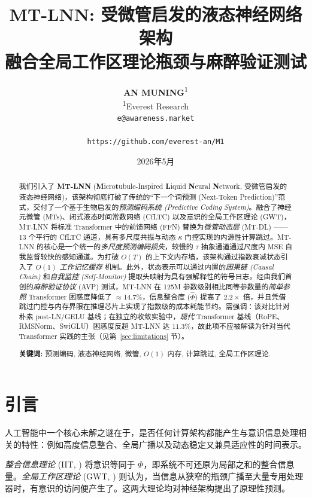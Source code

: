\documentclass[11pt]{article}
\title{
  \textbf{MT-LNN: 受微管启发的液态神经网络架构\\
  融合全局工作区理论瓶颈与麻醉验证测试}
}
\author{
  \textbf{AN MUNING}\textsuperscript{1} \\
  \textsuperscript{1}Everest Research \\
  \texttt{e@awareness.market} \\
  \vspace{0.2cm} \\
  \texttt{https://github.com/everest-an/M1}
}
\date{2026年5月}
\theoremstyle{definition}
\begin{document}
\maketitle

\begin{abstract}
我们引入了 \textbf{MT-LNN} (\textbf{M}icro\textbf{t}ubule-Inspired \textbf{L}iquid \textbf{N}eural \textbf{N}etwork, 受微管启发的液态神经网络)，该架构彻底打破了传统的“下一个词预测 (Next-Token Prediction)”范式，交付了一个基于生物启发的\emph{预测编码系统 (Predictive Coding System)}。融合了神经元微管 (MTs)、闭式液态时间常数网络 (CfLTC) 以及意识的全局工作区理论 (GWT)，MT-LNN 将标准 Transformer 中的前馈网络 (FFN) 替换为\emph{微管动态层} (MT-DL) —— 13 个平行的 CfLTC 通道，具有多尺度共振与动态 $\kappa$ 门控实现的内源性计算跳过。MT-LNN 的核心是一个统一的\emph{多尺度预测编码损失}，较慢的 $\tau$ 抽象通道通过尺度内 MSE 自我监督较快的感知通道。为打破 $O(T)$ 的上下文内存墙，该架构通过指数衰减状态引入了 \emph{$O(1)$ 工作记忆缓存} 机制。此外，状态表示可以通过内置的\emph{因果链 (Causal Chain)} 和\emph{自我监控 (Self-Monitor)} 提取头映射为具有强解释性的符号日志。经由我们首创的\emph{麻醉验证协议} (AVP) 测试，MT-LNN 在 125M 参数级别相比同等参数量的\emph{简单参照} Transformer 困惑度降低了 $\approx$14.7\%，信息整合度 ($\hat{\Phi}$) 提高了 $2.2\times$ 倍，并且凭借跳过门控与内存界限在推理芯片上实现了指数级的成本耗能节约。需强调：该对比针对朴素 post-LN/GELU 基线；在独立的收敛实验中，\emph{现代} Transformer 基线（RoPE、RMSNorm、SwiGLU）困惑度反超 MT-LNN 达 $11.3\%$，故此项不应被解读为针对当代 Transformer 实践的主张（见第~\ref{sec:limitations} 节）。

\medskip
\noindent\textbf{关键词:} 预测编码, 液态神经网络, 微管, $O(1)$ 内存, 计算跳过, 全局工作区理论.
\end{abstract}

\section{引言}
\label{sec:intro}

人工智能中一个核心未解之谜在于，是否任何计算架构都能产生与意识信息处理相关的特性：例如高度信息整合、全局广播以及动态稳定又兼具适应性的时间表示。

\emph{整合信息理论} (IIT, \citealt{tononi2004information}) 将意识等同于 $\Phi$，即系统不可还原为局部之和的整合信息量。\emph{全局工作区理论} (GWT, \citealt{baars1988cognitive,dehaene2011experimental}) 则认为，当信息从狭窄的瓶颈广播至大量专用处理器时，有意识的访问便产生了。这两大理论均对神经架构提出了原理性预测。
\end{document}
